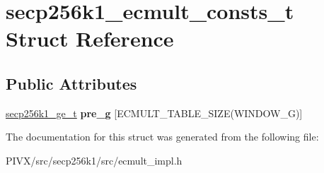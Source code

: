 \hypertarget{structsecp256k1__ecmult__consts__t}{}\section{secp256k1\+\_\+ecmult\+\_\+consts\+\_\+t Struct Reference}
\label{structsecp256k1__ecmult__consts__t}
\subsection*{Public Attributes}
\begin{DoxyCompactItemize}
\item 
\mbox{\label{structsecp256k1__ecmult__consts__t_a1c99ab4df9ca761b602aaea5cfe71dae}} 
\mbox{\hyperlink{structsecp256k1__ge__t}{secp256k1\+\_\+ge\+\_\+t}} {\bfseries pre\+\_\+g} \mbox{[}E\+C\+M\+U\+L\+T\+\_\+\+T\+A\+B\+L\+E\+\_\+\+S\+I\+ZE(W\+I\+N\+D\+O\+W\+\_\+G)\mbox{]}
\end{DoxyCompactItemize}


The documentation for this struct was generated from the following file\+:\begin{DoxyCompactItemize}
\item 
P\+I\+V\+X/src/secp256k1/src/ecmult\+\_\+impl.\+h\end{DoxyCompactItemize}
